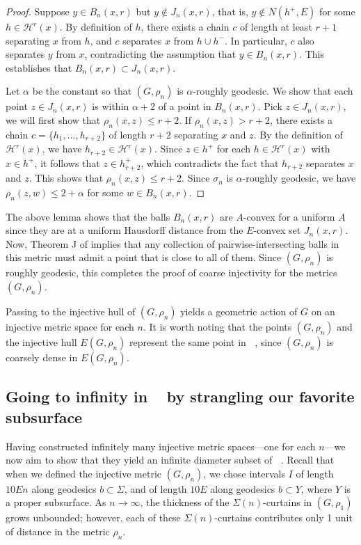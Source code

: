 \documentclass{amsart}
\numberwithin{thm}{section}
\numberwithin{figure}{section}
\theoremstyle{definition}
\theoremstyle{definition}
\theoremstyle{remark}
\numberwithin{equation}{section}
\DeclareMathOperator{\DDGS}{\mathcal{D}_{s}(G)}
\theoremstyle{plain}
\begin{document}
\begin{proof} 
Suppose $y \in B_n(x,r)$ but $y \notin J_n(x,r)$, that is,  $y \notin N(h^+,E)$ for some $h \in \mathcal{H}^r(x)$. By definition of $h$, there exists a chain $c$ of length at least $r+1$ separating $x$ from $h$, and $c$ separates $x$ from $h \cup h^-$. In particular, $c$ also separates $y$ from $x$, contradicting the assumption that $y \in B_n(x,r)$. This establishes that $B_n(x,r) \subset J_n(x,r)$. 

Let $\alpha$ be the constant so that $(G,\rho_n)$ is $\alpha$-roughly geodesic. We show that each point $z \in J_n(x,r)$ is within $\alpha+2$ of a point in $B_n(x,r)$. Pick $z \in J_n(x,r)$, we will first show that $\rho_n(x,z) \leq r+2.$ If $\rho_n(x,z) > r+2$, there exists a chain $c = \{ h_1, \dots, h_{r+2} \}$ of length $r+2$ separating $x$ and $z$. By the definition of $\mathcal{H}^r(x)$, we have $h_{r+2} \in \mathcal{H}^r(x)$. Since $z \in h^+$ for each $h \in \mathcal{H}^r(x)$ with $x \in h^+$, it follows that $z \in h_{r+2}^+$, which contradicts the fact that $h_{r+2}$ separates $x$ and $z$. This shows that $\rho_n(x,z) \leq r+2$. Since $\sigma_n$ is $\alpha$-roughly geodesic, we have $\rho_n(z,w) \leq 2+\alpha$ for some $w \in B_n(x,r).$
\end{proof}

The above lemma shows that the balls $B_n(x,r)$ are $A$-convex for a uniform $A$ since they are at a uniform Hausdorff distance from the $E$-convex set $J_n(x,r)$. Now, Theorem J of \cite{haettelhodapetyt:coarse} implies that any collection of pairwise-intersecting balls in this metric must admit a point that is close to all of them. Since $(G, \rho_n)$ is roughly geodesic, this completes the proof of coarse injectivity for the metrics $(G, \rho_n)$. 

Passing to the injective hull of $(G, \rho_n)$ yields a geometric action of $G$ on an injective metric space for each $n$. It is worth noting that the points $(G, \rho_n)$ and the injective hull $E(G, \rho_n)$ represent the same point in $\DDGS$, since $(G, \rho_n)$ is coarsely dense in $E(G,\rho_n)$.




\subsection{Going to infinity in $\DDGS$ by strangling our favorite subsurface}

Having constructed infinitely many injective metric spaces—one for each $n$—we now aim to show that they yield an infinite diameter subset of $\DDGS$. Recall that when we defined the injective metric $(G, \rho_n)$, we chose intervals $I$ of length $10E n$ along geodesics $b \subset \Sigma$, and of length $10E$ along geodesics $b \subset Y$, where $Y$ is a proper subsurface. As $n \to \infty$, the thickness of the $\Sigma(n)$-curtains in $(G, \rho_1)$ grows unbounded; however, each of these $\Sigma(n)$-curtains contributes only 1 unit of distance in the metric $\rho_n$. 
\end{document}
